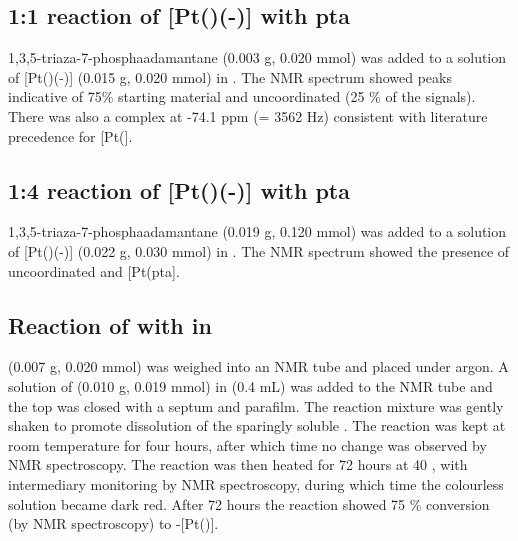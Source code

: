 \subsection*{1:1 reaction of \texorpdfstring{[Pt(\tButhixantphos)(-)]} P with pta}

1,3,5-triaza-7-phosphaadamantane (0.003 g, 0.020 mmol) was added to a solution of [Pt(\tButhixantphos)(-)] (0.015 g, 0.020 mmol) in .  The \phosphorus{} NMR spectrum showed peaks indicative of 75\% starting material and uncoordinated \tButhixantphos{} (25 \% of the \tButhixantphos{} signals).  There was also a complex at -74.1 ppm (\JPtP = 3562 Hz) consistent with literature precedence for [Pt(].\cite{Darensbourg1997}

\subsection*{1:4 reaction of \texorpdfstring{[Pt(\tButhixantphos)(-)]} P with pta}

1,3,5-triaza-7-phosphaadamantane (0.019 g, 0.120 mmol) was added to a solution of [Pt(\tButhixantphos)(-)] (0.022 g, 0.030 mmol) in .  The \phosphorus{} NMR spectrum showed the presence of uncoordinated \tButhixantphos{} and [Pt(pta].\cite{Darensbourg1997}


\subsection*{Reaction of \tButhixantphos{} with \ce{[Pt(C6H10)Cl2]} in }

\ce{[Pt(C6H10)Cl2]} (0.007 g, 0.020 mmol) was weighed into an NMR tube and placed under argon.  A solution of \tButhixantphos{} (0.010 g, 0.019 mmol) in  (0.4 mL) was added to the NMR tube and the top was closed with a septum and parafilm.  The reaction mixture was gently shaken to promote dissolution of the sparingly soluble \ce{[Pt(C6H10)Cl2]}.  The reaction was kept at room temperature for four hours, after which time no change was observed by NMR spectroscopy.  The reaction was then heated for 72 hours at 40 \degC, with intermediary monitoring by NMR spectroscopy, during which time the colourless solution became dark red.  After 72 hours the reaction showed 75 \% conversion (by \phosphorus{} NMR spectroscopy) to \trans-[Pt(\tBuxantphos)].

